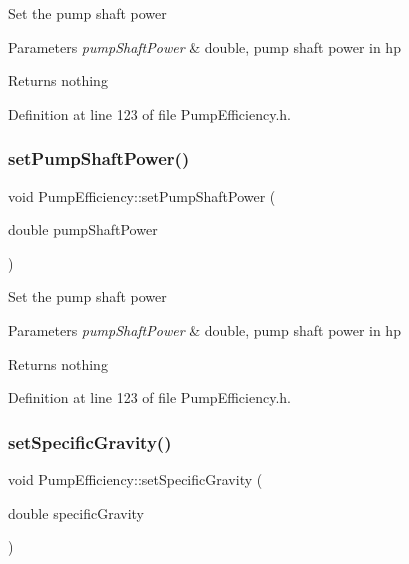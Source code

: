 Set the pump shaft power


\begin{DoxyParams}{Parameters}
{\em pump\+Shaft\+Power} & double, pump shaft power in hp\\
\hline
\end{DoxyParams}
\begin{DoxyReturn}{Returns}
nothing 
\end{DoxyReturn}


Definition at line 123 of file Pump\+Efficiency.\+h.

\mbox{\label{class_pump_efficiency_ad3c2e64a590528b54e3878f9d1f3223a}} 
\subsubsection{\texorpdfstring{set\+Pump\+Shaft\+Power()}{setPumpShaftPower()}\hspace{0.1cm}{\footnotesize\ttfamily [3/3]}}
{\footnotesize\ttfamily void Pump\+Efficiency\+::set\+Pump\+Shaft\+Power (\begin{DoxyParamCaption}\item[{double}]{pump\+Shaft\+Power }\end{DoxyParamCaption})\hspace{0.3cm}{\ttfamily [inline]}}

Set the pump shaft power


\begin{DoxyParams}{Parameters}
{\em pump\+Shaft\+Power} & double, pump shaft power in hp\\
\hline
\end{DoxyParams}
\begin{DoxyReturn}{Returns}
nothing 
\end{DoxyReturn}


Definition at line 123 of file Pump\+Efficiency.\+h.

\mbox{\label{class_pump_efficiency_afc8b3ecd0fe1a356c82042aa0fc84024}} 
\subsubsection{\texorpdfstring{set\+Specific\+Gravity()}{setSpecificGravity()}\hspace{0.1cm}{\footnotesize\ttfamily [1/3]}}
{\footnotesize\ttfamily void Pump\+Efficiency\+::set\+Specific\+Gravity (\begin{DoxyParamCaption}\item[{double}]{specific\+Gravity }\end{DoxyParamCaption})\hspace{0.3cm}{\ttfamily [inline]}}

